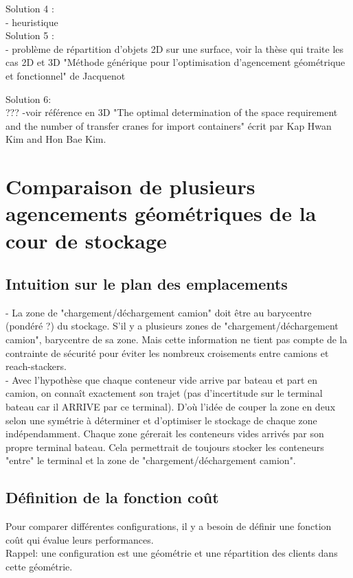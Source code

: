 \documentclass{article}
\begin{document}
Solution 4 : \\
- heuristique \\

Solution 5 : \\
- problème de répartition d'objets 2D sur une surface, voir la thèse qui traite les cas 2D et 3D "Méthode générique pour l’optimisation d’agencement géométrique et fonctionnel" de Jacquenot

Solution 6: \\ 
???
-voir référence en 3D "The optimal determination of the space requirement and the number of transfer cranes for import containers" écrit par Kap Hwan Kim and Hon Bae Kim.


\section{Comparaison de plusieurs agencements géométriques de la cour de stockage}

\subsection{Intuition sur le plan des emplacements}

- La zone de "chargement/déchargement camion" doit être au barycentre (pondéré ?) du stockage. S'il y a plusieurs zones de "chargement/déchargement camion", barycentre de sa zone. Mais cette information ne tient pas compte de la contrainte de sécurité pour éviter les nombreux croisements entre camions et reach-stackers. \\

- Avec l'hypothèse que chaque conteneur vide arrive par bateau et part en camion, on connaît exactement son trajet (pas d'incertitude sur le terminal bateau car il ARRIVE par ce terminal). D'où l'idée de couper la zone en deux selon une symétrie à déterminer et d'optimiser le stockage de chaque zone indépendamment. Chaque zone gérerait les conteneurs vides arrivés par son propre terminal bateau. Cela permettrait de toujours stocker les conteneurs "entre" le terminal et la zone de "chargement/déchargement camion". \\


\subsection{Définition de la fonction coût}

Pour comparer différentes configurations, il y a besoin de définir une fonction coût qui évalue leurs performances. \\ Rappel: une configuration est une géométrie et une répartition des clients dans cette géométrie. \\
\end{document}
